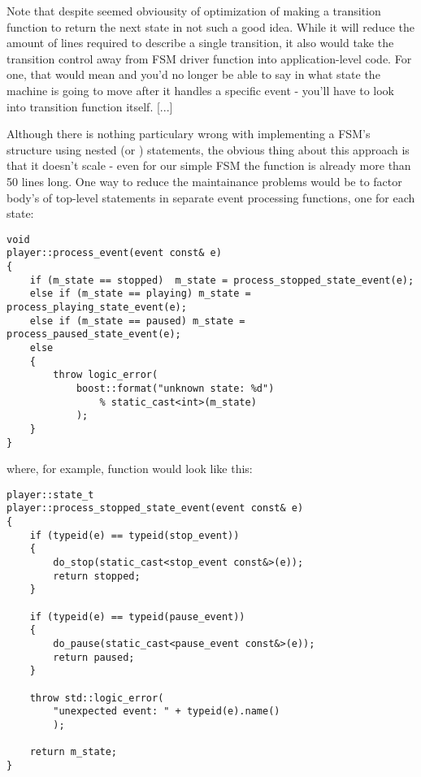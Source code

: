\documentclass{netobjectdays}
\begin{document}
Note that despite seemed obviousity of optimization of making 
a transition function to return the next state in not such a 
good idea. While it will reduce the amount of lines required 
to describe a single transition, it also would take the 
transition control away from FSM driver function into 
application-level code. For one, that would mean and you'd no 
longer be able to say in what state the machine is going to 
move after it handles a specific event - you'll have to look 
into transition function itself. [...] 

Although there is nothing particulary wrong with implementing 
a FSM's structure using nested  (or )
statements, the obvious thing about this approach is that it 
doesn't scale - even for our simple FSM the 
 function is already more than 50 lines
long. One way to reduce the maintainance problems would be to 
factor body's of top-level  statements in separate 
event processing functions, one for each state:


{\footnotesize
\begin{verbatim}
void
player::process_event(event const& e)
{
    if (m_state == stopped)  m_state = process_stopped_state_event(e);
    else if (m_state == playing) m_state = process_playing_state_event(e);
    else if (m_state == paused) m_state = process_paused_state_event(e);
    else
    {
        throw logic_error(
            boost::format("unknown state: %d")
                % static_cast<int>(m_state)
            );
    }
}
\end{verbatim}
}

where, for example,  
function would look like this:

{\footnotesize
\begin{verbatim}
player::state_t
player::process_stopped_state_event(event const& e)
{
    if (typeid(e) == typeid(stop_event))
    {
        do_stop(static_cast<stop_event const&>(e));
        return stopped;
    }

    if (typeid(e) == typeid(pause_event))
    {
        do_pause(static_cast<pause_event const&>(e));
        return paused;
    }

    throw std::logic_error(
        "unexpected event: " + typeid(e).name()
        );

    return m_state;
}
\end{verbatim}
}
\end{document}
